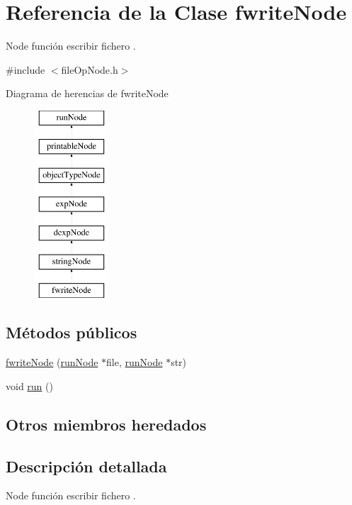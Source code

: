 \hypertarget{classfwriteNode}{\section{Referencia de la Clase fwrite\-Node}
\label{classfwriteNode}
}


Node función escribir fichero .  




{\ttfamily \#include $<$file\-Op\-Node.\-h$>$}

Diagrama de herencias de fwrite\-Node\begin{figure}[H]
\begin{center}
\leavevmode
\includegraphics[height=7.000000cm]{classfwriteNode}
\end{center}
\end{figure}
\subsection*{Métodos públicos}
\begin{DoxyCompactItemize}
\item 
\hyperlink{classfwriteNode_aef6a275b6900529690bb3cc2556146aa}{fwrite\-Node} (\hyperlink{classrunNode}{run\-Node} $\ast$file, \hyperlink{classrunNode}{run\-Node} $\ast$str)
\item 
void \hyperlink{classfwriteNode_aea4d89505071406cc2caceb55ce00c66}{run} ()
\end{DoxyCompactItemize}
\subsection*{Otros miembros heredados}


\subsection{Descripción detallada}
Node función escribir fichero . 

